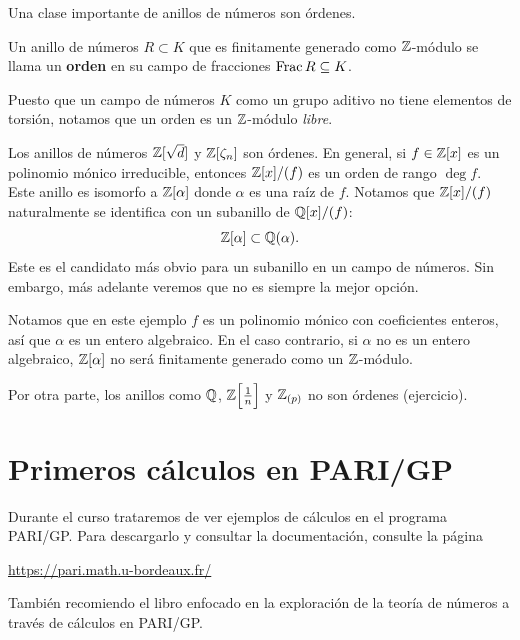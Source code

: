 Una clase importante de anillos de números son órdenes.

\begin{definicion}
  Un anillo de números $R \subset K$ que es finitamente generado como
  $\mathbb{Z}$-módulo se llama un \textbf{orden} en su campo de fracciones
  $\operatorname{Frac} R \subseteq K$.
\end{definicion}

Puesto que un campo de números $K$ como un grupo aditivo no tiene elementos
de torsión, notamos que un orden es un $\mathbb{Z}$-módulo \emph{libre}.

\begin{ejemplo}
  Los anillos de números $\mathbb{Z} [\sqrt{d}]$ y $\mathbb{Z} [\zeta_n]$ son órdenes.
  En general, si $f \in \mathbb{Z} [x]$ es un polinomio mónico irreducible, entonces
  $\mathbb{Z} [x]/(f)$ es un orden de rango $\deg f$. Este anillo es isomorfo a
  $\mathbb{Z} [\alpha]$ donde $\alpha$ es una raíz de $f$. Notamos que $\mathbb{Z} [x]/(f)$
  naturalmente se identifica con un subanillo de $\mathbb{Q} [x]/(f)$:
  $$\mathbb{Z} [\alpha] \subset \mathbb{Q} (\alpha).$$
  Este es el candidato más obvio para un subanillo en un campo de números.
  Sin embargo, más adelante veremos que no es siempre la mejor opción.

  Notamos que en este ejemplo $f$ es un polinomio mónico con coeficientes
  enteros, así que $\alpha$ es un entero algebraico. En el caso contrario,
  si $\alpha$ no es un entero algebraico, $\mathbb{Z} [\alpha]$ no será finitamente
  generado como un $\mathbb{Z}$-módulo.
\end{ejemplo}

\begin{ejemplo}
  Por otra parte, los anillos como $\mathbb{Q}$, $\mathbb{Z} \Bigl[\frac{1}{n}\Bigr]$ y
  $\mathbb{Z}_{(p)}$ no son órdenes (ejercicio).
\end{ejemplo}


\section{Primeros cálculos en PARI/GP}

Durante el curso trataremos de ver ejemplos de cálculos en el programa
PARI/GP. Para descargarlo y consultar la documentación, consulte la página
\begin{center}
  \url{https://pari.math.u-bordeaux.fr/}
\end{center}
También recomiendo el libro \cite{Rodriguez-Villegas-2007} enfocado en la
exploración de la teoría de números a través de cálculos en PARI/GP.

